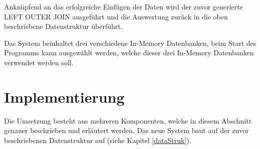 \documentclass[draft,final]{vutinfth} %
\begin{document}
Anknüpfend an das erfolgreiche Einfügen der Daten wird der zuvor generierte LEFT OUTER JOIN ausgeführt und die Auswertung zurück in die oben beschriebene Datenstruktur überführt. 

Das System beinhaltet drei verschiedene In-Memory Datenbanken, beim Start des Programms kann ausgewählt werden, welche dieser drei In-Memory Datenbanken verwendet werden soll.

\section{Implementierung}
Die Umsetzung besteht aus mehreren Komponenten, welche in diesem Abschnitt genauer beschrieben und erläutert werden. Das neue System baut auf der zuvor beschriebenen Datenstruktur auf (siehe Kapitel \ref{dataStruk}).
\end{document}
